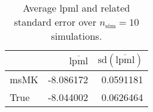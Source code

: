 \begin{table}[H]

\caption{Average lpml and related standard error over $n_{\text{sim}} = 10$ simulations.}
\centering
\begin{tabular}[t]{lrr}
\toprule
  & $\overbar{\text{lpml}}$ & $\text{sd}(\overbar{\text{lpml}})$\\
\midrule
msMK & -8.086172 & 0.0591181\\
True & -8.044002 & 0.0626464\\
\bottomrule
\end{tabular}
\end{table}